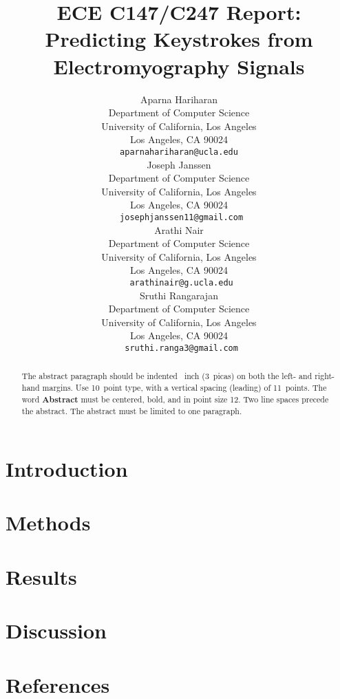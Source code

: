 \documentclass{article}
\title{ECE C147/C247 Report: Predicting Keystrokes from Electromyography Signals}
\author{%
  Aparna Hariharan\\
  Department of Computer Science\\
  University of California, Los Angeles\\
  Los Angeles, CA 90024 \\
  \texttt{aparnahariharan@ucla.edu} \\
    \And
    Joseph Janssen \\
  Department of Computer Science\\
  University of California, Los Angeles\\
  Los Angeles, CA 90024 \\
  \texttt{
josephjanssen11@gmail.com} \\
\And
Arathi Nair\\
  Department of Computer Science\\
  University of California, Los Angeles\\
  Los Angeles, CA 90024 \\
  \texttt{
arathinair@g.ucla.edu} \\
\And
Sruthi Rangarajan\\
  Department of Computer Science\\
  University of California, Los Angeles\\
  Los Angeles, CA 90024 \\
  \texttt{
sruthi.ranga3@gmail.com} \\
}
\begin{document}
\maketitle


\begin{abstract}
  The abstract paragraph should be indented ~inch (3~picas) on
  both the left- and right-hand margins. Use 10~point type, with a vertical
  spacing (leading) of 11~points.  The word \textbf{Abstract} must be centered,
  bold, and in point size 12. Two line spaces precede the abstract. The abstract
  must be limited to one paragraph.
\end{abstract}

\section{Introduction}
\section{Methods}
\section{Results}
\section{Discussion}
\section{References}
\end{document}
